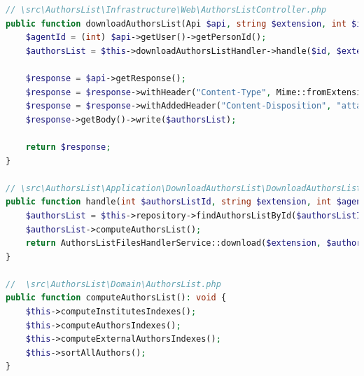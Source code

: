\begin{lstlisting}[language=PHP, caption={Hexagonal Architecture Implementation.}, label=lst:hexagonal]
// \src\AuthorsList\Infrastructure\Web\AuthorsListController.php
public function downloadAuthorsList(Api $api, string $extension, int $id) {
    $agentId = (int) $api->getUser()->getPersonId();
    $authorsList = $this->downloadAuthorsListHandler->handle($id, $extension, $agentId);

    $response = $api->getResponse();
    $response = $response->withHeader("Content-Type", Mime::fromExtension($extension));
    $response = $response->withAddedHeader("Content-Disposition", "attachment");
    $response->getBody()->write($authorsList);

    return $response;
}

// \src\AuthorsList\Application\DownloadAuthorsList\DownloadAuthorsListHandler.php
public function handle(int $authorsListId, string $extension, int $agentId) {
    $authorsList = $this->repository->findAuthorsListById($authorsListId);
    $authorsList->computeAuthorsList();
    return AuthorsListFilesHandlerService::download($extension, $authorsList->serialized(), $agentId);
}

//  \src\AuthorsList\Domain\AuthorsList.php
public function computeAuthorsList(): void {
    $this->computeInstitutesIndexes();
    $this->computeAuthorsIndexes();
    $this->computeExternalAuthorsIndexes();
    $this->sortAllAuthors();
}
\end{lstlisting}

